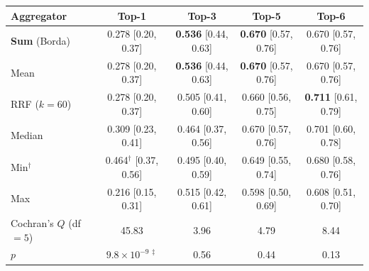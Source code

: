 %
%
%
%     
%
%

\begin{tabular}{lcccc}
\toprule
Aggregator & Top-1 & Top-3 & Top-5 & Top-6 \\
\midrule
\textbf{Sum} (Borda)        & 0.278 [0.20, 0.37]           & \textbf{0.536} [0.44, 0.63] & \textbf{0.670} [0.57, 0.76] & 0.670 [0.57, 0.76]           \\
Mean                        & 0.278 [0.20, 0.37]           & \textbf{0.536} [0.44, 0.63] & \textbf{0.670} [0.57, 0.76] & 0.670 [0.57, 0.76]           \\
RRF ($k\!=\!60$)            & 0.278 [0.20, 0.37]           & 0.505 [0.41, 0.60]          & 0.660 [0.56, 0.75]          & \textbf{0.711} [0.61, 0.79]  \\
Median                      & 0.309 [0.23, 0.41]           & 0.464 [0.37, 0.56]          & 0.670 [0.57, 0.76]          & 0.701 [0.60, 0.78]           \\
Min$^\dagger$               & 0.464$^\dagger$ [0.37, 0.56] & 0.495 [0.40, 0.59]          & 0.649 [0.55, 0.74]          & 0.680 [0.58, 0.76]           \\
Max                         & 0.216 [0.15, 0.31]           & 0.515 [0.42, 0.61]          & 0.598 [0.50, 0.69]          & 0.608 [0.51, 0.70]           \\
\midrule
Cochran's $Q$ (df $= 5$)    & 45.83                                & 3.96 & 4.79 & 8.44 \\
\quad $p$                   & $9.8\!\times\!10^{-9\,\ddagger}$     & 0.56 & 0.44 & 0.13 \\
\bottomrule
\end{tabular}

